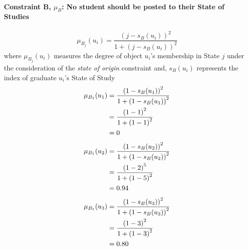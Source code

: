 \documentclass[a4paper]{book}
\begin{document}
			\paragraph{Constraint B, $\mu_B$: No student should be posted to their State of Studies}
				\begin{equation}
					\mu_{B_j}(u_i) = \frac{\left(j-s_B(u_i)\right)^2}{1 + \left(j-s_B(u_i)\right)^2}
				\end{equation}
				where $\mu_{B_j}(u_i)$ measures the degree of object $u_i$'s membership in State $j$ under the consideration of the \textit{state of origin} constraint and,
				$s_B(u_i)$ represents the index of graduate $u_i$'s State of Study\\
				\begin{align}
					\mu_{B_1}(u_1) &= \frac{\left(1-s_B(u_1)\right)^2}{1 + \left(1-s_B(u_1)\right)^2}\\
					&= \frac{\left(1-1\right)^2}{1 + \left(1-1\right)^2} \notag \\
					&= 0 \notag
				\end{align}
				\begin{align}
					\mu_{B_1}(u_2) &= \frac{\left(1-s_B(u_2)\right)^2}{1 + \left(1-s_B(u_2)\right)^2}\\
					&= \frac{\left(1-2\right)^5}{1 + \left(1-5\right)^2} \notag \\
					&= 0.94 \notag
				\end{align}
				\begin{align}
					\mu_{B_1}(u_3) &= \frac{\left(1-s_B(u_3)\right)^2}{1 + \left(1-s_B(u_3)\right)^2}\\
					&= \frac{\left(1-3\right)^2}{1 + \left(1-3\right)^2} \notag \\
					&= 0.80 \notag
				\end{align}
\end{document}
